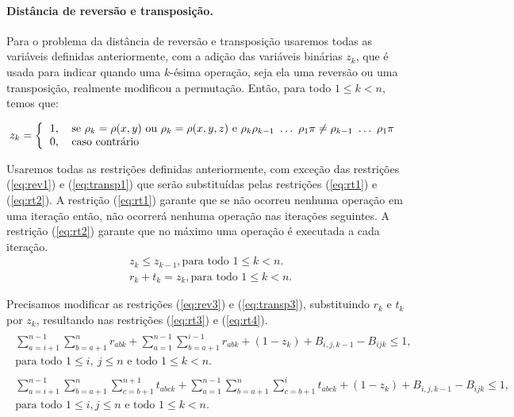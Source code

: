 \paragraph{Distância de reversão e transposição.}
Para o problema da distância de reversão e transposição usaremos todas
as variáveis definidas anteriormente, com a adição das variáveis
binárias $z_{k}$, que é usada para indicar quando uma $k$-ésima
operação, seja ela uma reversão ou uma transposição, realmente modificou
a permutação. Então, para todo $1 \le k < n$, temos que:

\[
z_{k} = \left \{ 
  \begin{tabular}{ll} 
  1, & se $\rho_{k} = \rho(x,y)$ ou $\rho_{k} = \rho(x,y,z)$ e
  $\rho_{k} \rho_{k-1}~\ldots~\rho_{1} \pi \neq \rho_{k-1}~\ldots~\rho_{1} \pi$\\
  0, & caso contrário
  \end{tabular} \right .
\]

Usaremos todas as restrições definidas anteriormente, com exceção das
restrições (\ref{eq:rev1}) e (\ref{eq:transp1}) que serão substituídas
pelas restrições (\ref{eq:rt1}) e (\ref{eq:rt2}). A restrição
(\ref{eq:rt1}) garante que se não ocorreu nenhuma operação em uma
iteração então, não ocorrerá nenhuma operação nas iterações seguintes. A
restrição (\ref{eq:rt2}) garante que no máximo uma operação é executada
a cada iteração.
\begin{align}
  &z_{k} \le z_{k-1}, \text{para todo $1 \le k <
    n$}. \label{eq:rt1} \\ 
  &r_{k} + t_{k} = z_{k} , \text{para todo
    $1 \le k < n$}. \label{eq:rt2}
\end{align}

Precisamos modificar as restrições (\ref{eq:rev3}) e (\ref{eq:transp3}),
substituindo $r_{k}$ e $t_{k}$ por $z_{k}$, resultando nas restrições
(\ref{eq:rt3}) e (\ref{eq:rt4}).
\begin{align}
  \begin{split}
    \sum_{a=i+1}^{n-1}\sum_{b=a+1}^{n} r_{abk} +
    \sum_{a=1}^{n-1}\sum_{b=a+1}^{i-1} r_{abk} +
    (1 - z_{k}) + B_{i,j,k-1} - B_{ijk} \le 1, \\
    \text{para todo $1 \le i,~j \le n$ e todo $1 \le k < n$}.
  \end{split} \label{eq:rt3} \\
  \begin{split} 
    \sum_{a=i+1}^{n-1}\sum_{b=a+1}^{n}\sum_{c=b+1}^{n+1} t_{abck}
    + \sum_{a=1}^{n-1}\sum_{b=a+1}^{n}\sum_{c=b+1}^{i} t_{abck} + (1 -
    z_{k}) + B_{i,j,k-1} - B_{ijk} \le 1, \\
    \text{para todo $1 \le i, j \le n$ e todo $1 \le k <
    n$}.
  \end{split} \label{eq:rt4}
\end{align}

